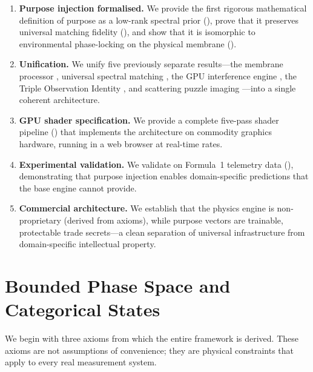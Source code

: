 \documentclass[11pt,twocolumn,a4paper]{article}
\theoremstyle{definition}
\theoremstyle{remark}
\begin{document}
\begin{enumerate}
    \item \textbf{Purpose injection formalised.}  We provide the first rigorous mathematical definition of purpose as a low-rank spectral prior (), prove that it preserves universal matching fidelity (), and show that it is isomorphic to environmental phase-locking on the physical membrane ().

    \item \textbf{Unification.}  We unify five previously separate results---the membrane processor \citep{sachikonye2026metacognitive}, universal spectral matching \citep{sachikonye2026spectralmatching}, the GPU interference engine \citep{sachikonye2026spectralmatching}, the Triple Observation Identity \citep{sachikonye2026raytracing}, and scattering puzzle imaging \citep{sachikonye2026scattering}---into a single coherent architecture.

    \item \textbf{GPU shader specification.}  We provide a complete five-pass shader pipeline () that implements the architecture on commodity graphics hardware, running in a web browser at real-time rates.

    \item \textbf{Experimental validation.}  We validate on Formula~1 telemetry data (), demonstrating that purpose injection enables domain-specific predictions that the base engine cannot provide.

    \item \textbf{Commercial architecture.}  We establish that the physics engine is non-proprietary (derived from axioms), while purpose vectors are trainable, protectable trade secrets---a clean separation of universal infrastructure from domain-specific intellectual property.
\end{enumerate}

\section{Bounded Phase Space and Categorical States}\label{sec:bounded-phase-space}

We begin with three axioms from which the entire framework is derived.  These axioms are not assumptions of convenience; they are physical constraints that apply to every real measurement system.
\end{document}
